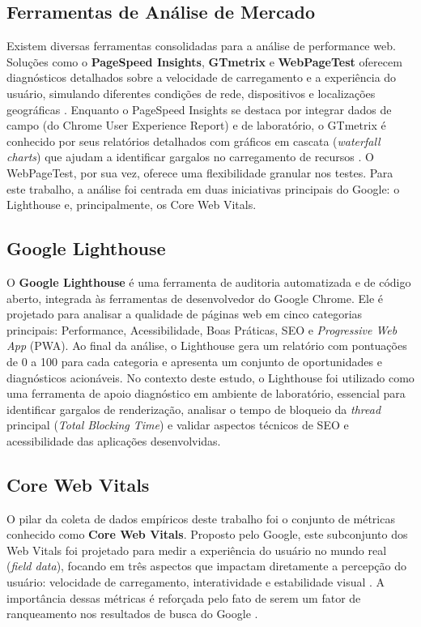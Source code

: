 \subsection{Ferramentas de Análise de Mercado}
\label{subsec:ferramentas-analise}
Existem diversas ferramentas consolidadas para a análise de performance web. Soluções como o \textbf{PageSpeed Insights}, \textbf{GTmetrix} e \textbf{WebPageTest} oferecem diagnósticos detalhados sobre a velocidade de carregamento e a experiência do usuário, simulando diferentes condições de rede, dispositivos e localizações geográficas \cite{webabsoluta_ferramentas}. Enquanto o PageSpeed Insights se destaca por integrar dados de campo (do Chrome User Experience Report) e de laboratório, o GTmetrix é conhecido por seus relatórios detalhados com gráficos em cascata (\textit{waterfall charts}) que ajudam a identificar gargalos no carregamento de recursos \cite{gtmetrix_vitals}. O WebPageTest, por sua vez, oferece uma flexibilidade granular nos testes. Para este trabalho, a análise foi centrada em duas iniciativas principais do Google: o Lighthouse e, principalmente, os Core Web Vitals.

\subsection{Google Lighthouse}
\label{subsec:google-lighthouse}
O \textbf{Google Lighthouse} é uma ferramenta de auditoria automatizada e de código aberto, integrada às ferramentas de desenvolvedor do Google Chrome. Ele é projetado para analisar a qualidade de páginas web em cinco categorias principais: Performance, Acessibilidade, Boas Práticas, SEO e \textit{Progressive Web App} (PWA). Ao final da análise, o Lighthouse gera um relatório com pontuações de 0 a 100 para cada categoria e apresenta um conjunto de oportunidades e diagnósticos acionáveis. No contexto deste estudo, o Lighthouse foi utilizado como uma ferramenta de apoio diagnóstico em ambiente de laboratório, essencial para identificar gargalos de renderização, analisar o tempo de bloqueio da \textit{thread} principal (\textit{Total Blocking Time}) e validar aspectos técnicos de SEO e acessibilidade das aplicações desenvolvidas.

\subsection{Core Web Vitals}
\label{subsec:core-web-vitals}
O pilar da coleta de dados empíricos deste trabalho foi o conjunto de métricas conhecido como \textbf{Core Web Vitals}. Proposto pelo Google, este subconjunto dos Web Vitals foi projetado para medir a experiência do usuário no mundo real (\textit{field data}), focando em três aspectos que impactam diretamente a percepção do usuário: velocidade de carregamento, interatividade e estabilidade visual \cite{osmani2025}. A importância dessas métricas é reforçada pelo fato de serem um fator de ranqueamento nos resultados de busca do Google \cite{google_cwv_search}.

